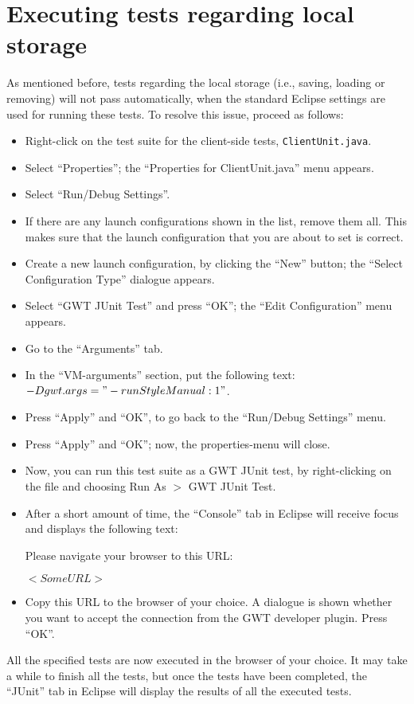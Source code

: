 \section{Executing tests regarding local storage}\label{sec:localStorageProc}
As mentioned before, tests regarding the local storage (i.e., saving, loading or removing) will not pass automatically, when the standard Eclipse settings are used for running these tests. To resolve this issue, proceed as follows:
\begin{itemize}
	\item Right-click on the test suite for the client-side tests, \texttt{ClientUnit.java}.
	\item Select ``Properties''; the ``Properties for ClientUnit.java'' menu appears.
	\item Select ``Run/Debug Settings''. 
	\item If there are any launch configurations shown in the list, remove them all. This makes sure that the launch configuration that you are about to set is correct.
	\item Create a new launch configuration, by clicking the ``New'' button; the ``Select Configuration Type'' dialogue appears.
	\item Select ``GWT JUnit Test'' and press ``OK''; the ``Edit Configuration'' menu appears.
	\item Go to the ``Arguments'' tab.
	\item In the ``VM-arguments'' section, put the following text: $-Dgwt.args="-runStyle Manual:1"$.
	\item Press ``Apply'' and ``OK'', to go back to the ``Run/Debug Settings'' menu.
	\item Press ``Apply'' and ``OK''; now, the properties-menu will close.
	\item Now, you can run this test suite as a GWT JUnit test, by right-clicking on the file and choosing Run As $>$ GWT JUnit Test.
	\item After a short amount of time, the ``Console'' tab in Eclipse will receive focus and displays the following text:

	\noindent Please navigate your browser to this URL:

	\noindent $<Some URL>$
	\item Copy this URL to the browser of your choice. A dialogue is shown whether you want to accept the connection from the GWT developer plugin. Press ``OK''.
\end{itemize}

\fpstartparagraph{} All the specified tests are now executed in the browser of your choice. It may take a while to finish all the tests, but once the tests have been completed, the ``JUnit'' tab in Eclipse will display the results of all the executed tests.

